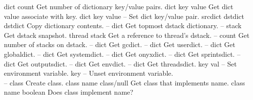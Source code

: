 \begin{longtable}{}
\optableent
	{dict}
	{{\bf {}}}
	{count}
	{Get number of dictionary key/value pairs.}
\hline
\optableent
	{dict key}
	{{\bf {}}}
	{value}
	{Get dict value associate with key.}
\hline
\optableent
	{dict key value}
	{{\bf {}}}
	{--}
	{Set dict key/value pair.}
\hline
\optableent
	{srcdict dstdict}
	{{\bf {}}}
	{dstdict}
	{Copy dictionary contents.}
\hline
\optableent
	{--}
	{{\bf {}}}
	{dict}
	{Get topmost dstack dictionary.}
\hline
\optableent
	{--}
	{{\bf {}}}
	{stack}
	{Get dstack snapshot.}
\hline
\optableent
	{thread}
	{{\bf {}}}
	{stack}
	{Get a reference to thread's dstack.}
\hline
\optableent
	{--}
	{{\bf {}}}
	{count}
	{Get number of stacks on dstack.}
\hline
\optableent
	{--}
	{{\bf {}}}
	{dict}
	{Get gcdict.}
\hline
\optableent
	{--}
	{{\bf {}}}
	{dict}
	{Get userdict.}
\hline
\optableent
	{--}
	{{\bf {}}}
	{dict}
	{Get globaldict.}
\hline
\optableent
	{--}
	{{\bf {}}}
	{dict}
	{Get systemdict.}
\hline
\optableent
	{--}
	{{\bf {}}}
	{dict}
	{Get onyxdict.}
\hline
\optableent
	{--}
	{{\bf {}}}
	{dict}
	{Get sprintsdict.}
\hline
\optableent
	{--}
	{{\bf {}}}
	{dict}
	{Get outputsdict.}
\hline
\optableent
	{--}
	{{\bf {}}}
	{dict}
	{Get envdict.}
\hline
\optableent
	{--}
	{{\bf {}}}
	{dict}
	{Get threadsdict.}
\hline
\optableent
	{key val}
	{{\bf {}}}
	{--}
	{Set environment variable.}
\hline
\optableent
	{key}
	{{\bf {}}}
	{--}
	{Unset environment variable.}
\hline \hline
{} \\
\hline \hline
\optableent
	{--}
	{{\bf {}}}
	{class}
	{Create class.}
\hline
\optableent
	{class name}
	{{\bf {}}}
	{class/null}
	{Get class that implements name.}
\hline
\optableent
	{class name}
	{{\bf {}}}
	{boolean}
	{Does class implement name?}

\end{longtable}
